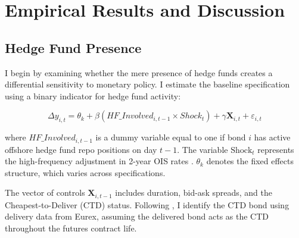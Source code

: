 \documentclass[english, 11pt, oneside]{article}
\begin{document}
\section{Empirical Results and Discussion}
\label{sec:empirical_results}

\subsection{Hedge Fund Presence}
\label{subsec:baseline}
I begin by examining whether the mere presence of hedge funds creates a differential sensitivity to monetary policy. I estimate the baseline specification using a binary indicator for hedge fund activity:

\begin{equation}
    \Delta y_{i,t} = \theta_{k} + \beta (HF\_Involved_{i,t-1} \times Shock_{t}) + \gamma \mathbf{X}_{i,t} + \varepsilon_{i,t}
\end{equation}

where $HF\_Involved_{i,t-1}$ is a dummy variable equal to one if bond $i$ has active offshore hedge fund repo positions on day $t-1$. The variable $\text{Shock}_{t}$ represents the high-frequency adjustment in 2-year OIS rates \citep{altavilla2019}. $\theta_{k}$ denotes the fixed effects structure, which varies across specifications.

The vector of controls $\mathbf{X}_{i,t-1}$ includes duration, bid-ask spreads, and the Cheapest-to-Deliver (CTD) status. Following \citet{pelizzon2025}, I identify the CTD bond using delivery data from Eurex, assuming the delivered bond acts as the CTD throughout the futures contract life.
\end{document}
